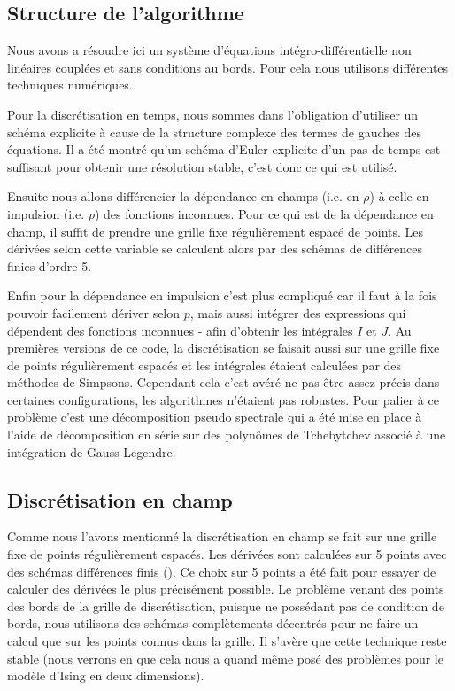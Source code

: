 \documentclass[10pt]{article}
\begin{document}
\begin{multicols}{2}


\subsection{Structure de l'algorithme}

Nous avons a résoudre ici un système d'équations intégro-différentielle non linéaires couplées et sans conditions au bords. Pour cela nous utilisons différentes techniques numériques. 

Pour la discrétisation en temps, nous sommes dans l'obligation d'utiliser un schéma explicite à cause de la structure complexe des termes de gauches des équations. Il a été montré qu'un schéma d'Euler explicite d'un pas de temps est suffisant pour obtenir une résolution stable, c'est donc ce qui est utilisé. 

Ensuite nous allons différencier la dépendance en champs (i.e. en $\rho$) à celle en impulsion (i.e. $p$) des fonctions inconnues. Pour ce qui est de la dépendance en champ, il suffit de prendre une grille fixe régulièrement espacé de points. Les dérivées selon cette variable se calculent alors par des schémas de différences finies d'ordre 5. 

Enfin pour la dépendance en impulsion c'est plus compliqué car il faut à la fois pouvoir facilement dériver selon $p$, mais aussi intégrer des expressions qui dépendent des fonctions inconnues - afin d'obtenir les intégrales $I$ et $J$. Au premières versions de ce code, la discrétisation se faisait aussi sur une grille fixe de points régulièrement espacés et les intégrales étaient calculées par des méthodes de Simpsons. Cependant cela c'est avéré ne pas être assez précis dans certaines configurations, les algorithmes n'étaient pas robustes. Pour palier à ce problème c'est une décomposition pseudo spectrale qui a été mise en place à l'aide de décomposition en série sur des polynômes de Tchebytchev associé à une intégration de Gauss-Legendre. 




\subsection{Discrétisation en champ}

Comme nous l'avons mentionné la discrétisation en champ se fait sur une grille fixe de points régulièrement espacés. Les dérivées sont calculées sur 5 points avec des schémas différences finis (). Ce choix sur 5 points  a été fait pour essayer de calculer des dérivées le plus précisément possible. Le problème venant des points des bords de la grille de discrétisation, puisque ne possédant pas de condition de bords, nous utilisons des schémas complètements décentrés pour ne faire un calcul que sur les points connus dans la grille. Il s'avère que cette technique reste stable (nous verrons en  que cela nous a quand même posé des problèmes pour le modèle d'Ising en deux dimensions). 


\end{multicols}
\end{document}
